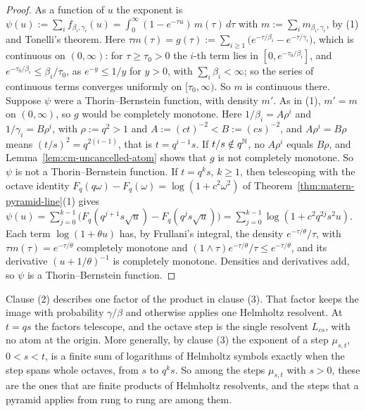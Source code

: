 \begin{proof}
As a function of $u$ the exponent is $\psi(u) := \sum_if_{\beta_i,\gamma_i}(u) =
\int_0^\infty(1 - e^{-\tau u})\,m(\tau)\,d\tau$ with $m := \sum_im_{\beta_i,\gamma_i}$, by (1) and
Tonelli's theorem. Here $\tau m(\tau) = g(\tau) := \sum_{i \ge 1}\bigl(e^{-\tau/\beta_i} -
e^{-\tau/\gamma_i}\bigr)$, which is continuous on $(0, \infty)$: for $\tau \ge \tau_0 > 0$ the $i$-th
term lies in $[0, e^{-\tau_0/\beta_i}]$, and $e^{-\tau_0/\beta_i} \le \beta_i/\tau_0$, as
$e^{-y} \le 1/y$ for $y > 0$, with $\sum_i\beta_i < \infty$; so the series of continuous terms
converges uniformly on $[\tau_0, \infty)$. So $m$ is continuous there.
Suppose $\psi$ were a Thorin--Bernstein function, with density $m'$. As in (1), $m' = m$ on
$(0, \infty)$, so $g$ would be completely monotone. Here $1/\beta_i = A\rho^i$ and
$1/\gamma_i = B\rho^i$, with $\rho := q^2 > 1$ and $A := (ct)^{-2} < B := (cs)^{-2}$, and
$A\rho^i = B\rho$ means $(t/s)^2 = q^{2(i-1)}$, that is $t = q^{i-1}s$. If $t/s \notin q^{\mathbb{N}}$, no
$A\rho^i$ equals $B\rho$, and Lemma~\ref{lem:cm-uncancelled-atom} shows that $g$ is not completely
monotone. So $\psi$ is not a Thorin--Bernstein function. If $t = q^ks$, $k \ge 1$, then telescoping
with the octave identity $F_q(q\omega) - F_q(\omega) = \log(1 + c^2\omega^2)$ of
Theorem~\ref{thm:matern-pyramid-line}(1) gives
$\psi(u) = \sum_{j=0}^{k-1}\bigl(F_q(q^{j+1}s\sqrt u) - F_q(q^js\sqrt u)\bigr) =
\sum_{j=0}^{k-1}\log(1 + c^2q^{2j}s^2u)$. Each term $\log(1 + \theta u)$ has, by Frullani's integral,
the density $e^{-\tau/\theta}/\tau$, with $\tau m(\tau) = e^{-\tau/\theta}$ completely monotone and
$(1 \wedge \tau)e^{-\tau/\theta}/\tau \le e^{-\tau/\theta}$, and its derivative
$(u + 1/\theta)^{-1}$ is completely monotone. Densities and derivatives add, so $\psi$ is a
Thorin--Bernstein function.
\end{proof}

Clause (2) describes one factor of the product in clause (3). That factor keeps the image with
probability $\gamma/\beta$ and otherwise applies one Helmholtz resolvent. At $t = qs$ the factors
telescope, and the octave step is the single resolvent $L_{cs}$, with no atom at the origin. More
generally, by clause (3) the exponent of a step $\mu_{s,t}$, $0 < s < t$, is a finite sum of
logarithms of Helmholtz symbols exactly when the step spans whole octaves, from $s$ to $q^ks$. So
among the steps $\mu_{s,t}$ with $s > 0$, these are the ones that are finite products of Helmholtz
resolvents, and the steps that a pyramid applies from rung to rung are among them.

